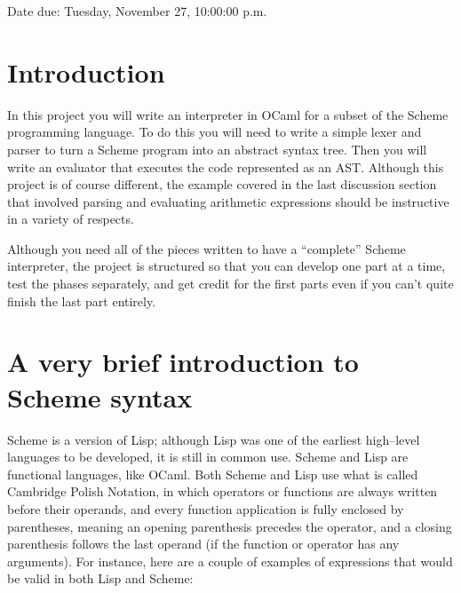\documentclass[11pt]{article}
\begin{document}

  \vspace{-3mm}

  \begin{centering}

    Date due: Tuesday, November 27, 10:00:00 p.m.

  \end{centering}

  \vspace{-6mm}


  \section{Introduction}

    In this project you will write an interpreter in OCaml for a subset of the
  Scheme programming language.  To do this you will need to write a simple
  lexer and parser to turn a Scheme program into an abstract syntax tree.
  Then you will write an evaluator that executes the code represented as an
  AST.  Although this project is of course different, the example covered in
  the last discussion section that involved parsing and evaluating
  arithmetic expressions should be instructive in a variety of respects.

    Although you need all of the pieces written to have a ``complete'' Scheme
  interpreter, the project is structured so that you can develop one part at
  a time, test the phases separately, and get credit for the first parts
  even if you can't quite finish the last part entirely.

  \section{A very brief introduction to Scheme syntax}

    Scheme is a version of Lisp; although Lisp was one of the earliest
  high--level languages to be developed, it is still in common use.  Scheme
  and Lisp are functional languages, like OCaml.  Both Scheme and Lisp use
  what is called Cambridge Polish Notation, in which operators or functions
  are always written before their operands, and every function application
  is fully enclosed by parentheses, meaning an opening parenthesis precedes
  the operator, and a closing parenthesis follows the last operand (if the
  function or operator has any arguments).  For instance, here are a couple
  of examples of expressions that would be valid in both Lisp and Scheme:
\end{document}
